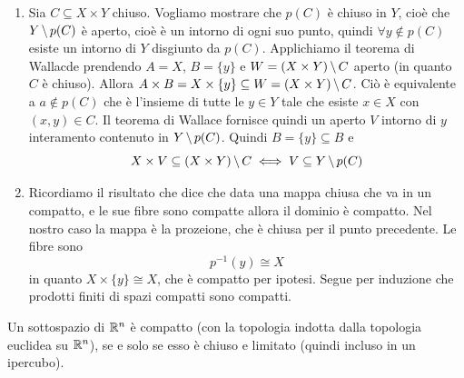 \documentclass[a4paper]{article}
\begin{document}
\begin{snippetproof}{}
    \begin{enumerate}
        \item Sia \(C \subseteq X \times Y\) chiuso.
        Vogliamo mostrare che \(p(C)\) è chiuso in \(Y\),
        cioè che \(Y \,\backslash\, p(C)\) è aperto, cioè
        è un intorno di ogni suo punto,
        quindi \(\forall y \notin p(C)\) esiste un intorno di \(Y\)
        disgiunto da \(p(C)\).
        Applichiamo il teorema di Wallacde prendendo
        \(A = X\), \(B = \{y\}\) e \(W = (X \times Y) \,\backslash\, C\) aperto
        (in quanto \(C\) è chiuso).
        Allora \(A \times B = X \times \{y\} \subseteq W = (X \times Y) \,\backslash\, C\).
        Ciò è equivalente a \(a \notin p(C)\)
        che è l'insieme di tutte le \(y \in Y\) tale che esiste \(x \in X\)
        con \((x,y) \in C\).
        Il teorema di Wallace fornisce
        quindi un aperto \(V\) intorno di \(y\) interamento contenuto
        in \(Y \,\backslash\, p(C)\).
        Quindi \(B = \{y\} \subseteq B\) e
        \[
            X \times V \subseteq (X \times Y) \,\backslash\, C
            \iff
            V \subseteq Y \,\backslash\, p(C)
        \]
        \item Ricordiamo il risultato che dice
        che data una mappa chiusa che va in un compatto, e le sue fibre
        sono compatte allora il dominio è compatto.
        Nel nostro caso la mappa è la prozeione, che è chiusa per il punto precedente.
        Le fibre sono
        \[
            p^{-1}(y) \cong X
        \]
        in quanto \(X \times \{y\} \cong X\),
        che è compatto per ipotesi.
        Segue per induzione che prodotti finiti di spazi compatti sono compatti.
    \end{enumerate}
\end{snippetproof}

\begin{snippetcorollary}{}
    Un sottospazio di \(\mathbb{R}^n\)
    è compatto (con la topologia indotta dalla topologia euclidea su \(\mathbb{R}^n\)),
    se e solo se esso è chiuso e limitato (quindi incluso in un ipercubo).
\end{snippetcorollary}
\end{document}
